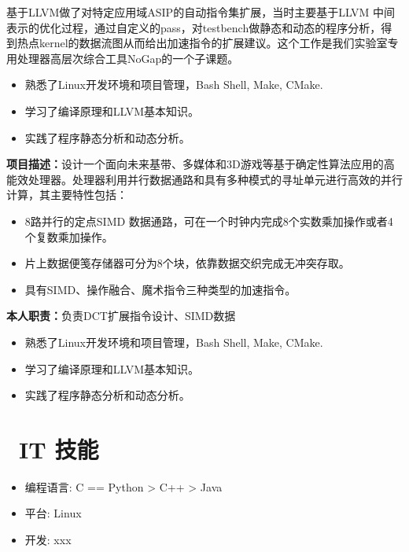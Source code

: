 \documentclass{resume}
\begin{document}
基于LLVM做了对特定应用域ASIP的自动指令集扩展，当时主要基于LLVM 中间表示的优化过程，通过自定义的pass，对testbench做静态和动态的程序分析，得到热点kernel的数据流图从而给出加速指令的扩展建议。这个工作是我们实验室专用处理器高层次综合工具NoGap的一个子课题。
\begin{itemize}
  \item 熟悉了Linux开发环境和项目管理，Bash Shell, Make, CMake.
  \item 学习了编译原理和LLVM基本知识。
  \item 实践了程序静态分析和动态分析。
\end{itemize}

\textbf{项目描述：}设计一个面向未来基带、多媒体和3D游戏等基于确定性算法应用的高能效处理器。处理器利用并行数据通路和具有多种模式的寻址单元进行高效的并行计算，其主要特性包括：
\begin{itemize}
  \item 8路并行的定点SIMD 数据通路，可在一个时钟内完成8个实数乘加操作或者4个复数乘加操作。
  \item 片上数据便笺存储器可分为8个块，依靠数据交织完成无冲突存取。
  \item 具有SIMD、操作融合、魔术指令三种类型的加速指令。
\end{itemize}

\textbf{本人职责：}负责DCT扩展指令设计、SIMD数据
\begin{itemize}
  \item 熟悉了Linux开发环境和项目管理，Bash Shell, Make, CMake.
  \item 学习了编译原理和LLVM基本知识。
  \item 实践了程序静态分析和动态分析。
\end{itemize}


\section{\faCogs\ IT 技能}
\begin{itemize}[parsep=0.5ex]
  \item 编程语言: C == Python > C++ > Java
  \item 平台: Linux
  \item 开发: xxx
\end{itemize}
\end{document}
